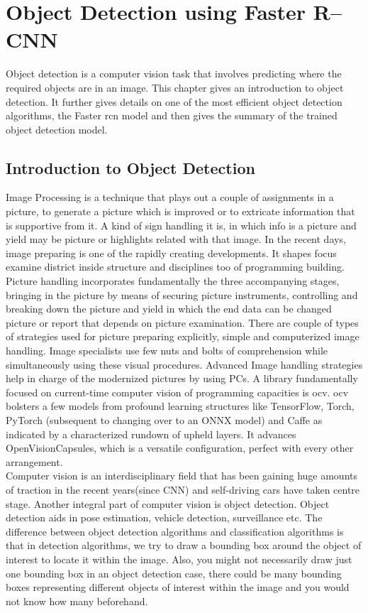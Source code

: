 \chapter{Object Detection using Faster R--CNN}

\indent\indent Object detection is a computer vision task that involves predicting where the required objects are in an image. This chapter gives an introduction to object detection. It further gives details on one of the most efficient object detection algorithms, the Faster \acrshort{rcn} model and then gives the summary of the trained object detection model.  
\section{Introduction to Object Detection}
Image Processing is a technique that plays out a couple of assignments in a picture, to generate a picture which is improved or to extricate information that is supportive from it. A kind of sign handling it is, in which info is a picture and yield may be picture or highlights related with that image. In the recent days, image preparing is one of the rapidly creating developments. It shapes focus examine district inside structure and disciplines too of programming building. Picture handling incorporates fundamentally the three accompanying stages, bringing in the picture by means of securing picture instruments, controlling and breaking down the picture and yield in which the end data can be changed picture or report that depends on picture examination. There are couple of types of strategies used for picture preparing explicitly, simple and computerized image handling. Image specialists use few nuts and bolts of comprehension while simultaneously using these visual procedures. Advanced Image handling strategies help in charge of the modernized pictures by using PCs. A library fundamentally focused on current-time computer vision of programming capacities is \gls{ocv}. \gls{ocv} bolsters a few models from profound learning structures like TensorFlow, Torch, PyTorch (subsequent to changing over to an ONNX model) and Caffe as indicated by a characterized rundown of upheld layers. It
advances OpenVisionCapsules, which is a versatile configuration, perfect with every other arrangement.\\
Computer vision is an interdisciplinary field that has been gaining huge amounts of traction in the recent years(since CNN) and self-driving cars have taken centre stage. Another integral part of computer vision is object detection. Object detection aids in pose estimation, vehicle detection, surveillance etc. The difference between object detection algorithms and classification algorithms is that in detection algorithms, we try to draw a bounding box around the object of interest to locate it within the image. Also, you might not necessarily draw just one bounding box in an object detection case, there could be many bounding boxes representing different objects of interest within the image and you would not know how many beforehand.\\
